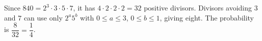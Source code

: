Since $840=2^3\cdot3\cdot5\cdot7$, it has $4\cdot2\cdot2\cdot2=32$ positive divisors. Divisors avoiding $3$ and $7$ can use only $2^a5^b$ with $0\le a\le3$, $0\le b\le1$, giving eight. The probability is $\dfrac{8}{32}=\boxed{\dfrac{1}{4}}$.
